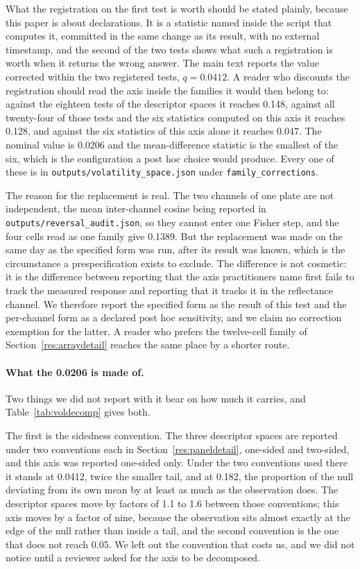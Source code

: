 \documentclass[11pt,a4paper]{article}
\begin{document}
What the registration on the first test is worth should be stated plainly,
because this paper is about declarations. It is a statistic named inside the
script that computes it, committed in the same change as its result, with no
external timestamp, and the second of the two tests shows what such a
registration is worth when it returns the wrong answer. The main text reports
the value corrected within the two registered tests, $q = 0.0412$. A reader who
discounts the registration should read the axis inside the families it would
then belong to: against the eighteen tests of the descriptor spaces it reaches
0.148, against all twenty-four of those tests and the six statistics computed on
this axis it reaches 0.128, and against the six statistics of this axis alone it
reaches 0.047. The nominal value is 0.0206 and the mean-difference statistic is
the smallest of the six, which is the configuration a post hoc choice would
produce. Every one of these is in
\texttt{outputs/volatility\_space.json} under \texttt{family\_corrections}.

The reason for the replacement is real. The two channels of one plate are not
independent, the mean inter-channel cosine being reported in
\texttt{outputs/reversal\_audit.json}, so they cannot enter one Fisher step,
and the four cells read as one family give 0.1389. But the replacement was
made on the same day as the specified form was run, after its result was
known, which is the circumstance a prespecification exists to exclude. The
difference is not cosmetic: it is the difference between reporting that the
axis practitioners name first fails to track the measured response and
reporting that it tracks it in the reflectance channel. We therefore report the
specified form as the result of this test and the per-channel form as a
declared post hoc sensitivity, and we claim no correction exemption for the
latter. A reader who prefers the twelve-cell family of
Section~\ref{res:arraydetail} reaches the same place by a shorter route.

\paragraph{What the 0.0206 is made of.} Two things we did not report with it
bear on how much it carries, and Table~\ref{tab:voldecomp} gives both.

The first is the sidedness convention. The three descriptor spaces are reported
under two conventions each in Section~\ref{res:paneldetail}, one-sided and
two-sided, and this axis was reported one-sided only. Under the two conventions
used there it stands at 0.0412, twice the smaller tail, and at 0.182, the
proportion of the null deviating from its own mean by at least as much as the
observation does. The descriptor spaces move by factors of 1.1 to 1.6 between
those conventions; this axis moves by a factor of nine, because the
observation sits almost exactly at the edge of the null rather than inside a
tail, and the second convention is the one that does not reach 0.05. We left out
the convention that costs us, and we did not notice until a reviewer asked for
the axis to be decomposed.
\end{document}
